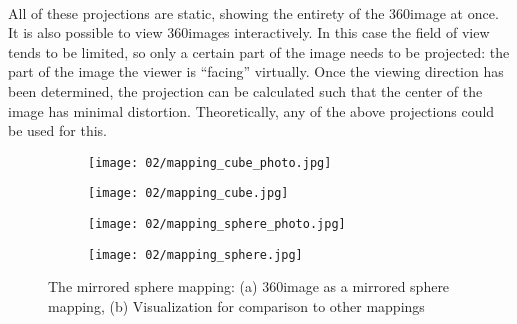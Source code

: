 \paragraph*{}
All of these projections are static, showing the entirety of the 360\degree image at once. It is also possible to view 360\degree images interactively. In this case the field of view tends to be limited, so only a certain part of the image needs to be projected: the part of the image the viewer is ``facing'' virtually. Once the viewing direction has been determined, the projection can be calculated such that the center of the image has minimal distortion. Theoretically, any of the above projections could be used for this. 

\begin{figure}
\centering
    \begin{subfigure}[b]{0.5\textwidth}            
            \centering
            \texttt{[image: 02/mapping\_cube\_photo.jpg]}
            \caption{}
    \end{subfigure}%
    \begin{subfigure}[b]{0.5\textwidth}
            \centering
            \texttt{[image: 02/mapping\_cube.jpg]}
            \caption{}
    \end{subfigure}
    \caption[Cube map mapping]{The cube map mapping: (a) 360\degree image as a cube map, (b) Visualization for comparison to other mappings \protect\footnotemark}\label{fig:cubemap-intro}

    \quad
    \begin{subfigure}[b]{0.5\textwidth}            
            \centering
            \texttt{[image: 02/mapping\_sphere\_photo.jpg]}
            \caption{}
    \end{subfigure}%
    \begin{subfigure}[b]{0.5\textwidth}
            \centering
            \texttt{[image: 02/mapping\_sphere.jpg]}
            \caption{}
    \end{subfigure}
    \caption[Mirrored sphere mapping]{The mirrored sphere mapping: (a) 360\degree image as a mirrored sphere mapping, (b) Visualization for comparison to other mappings}\label{fig:sphere-intro}


\end{figure}
